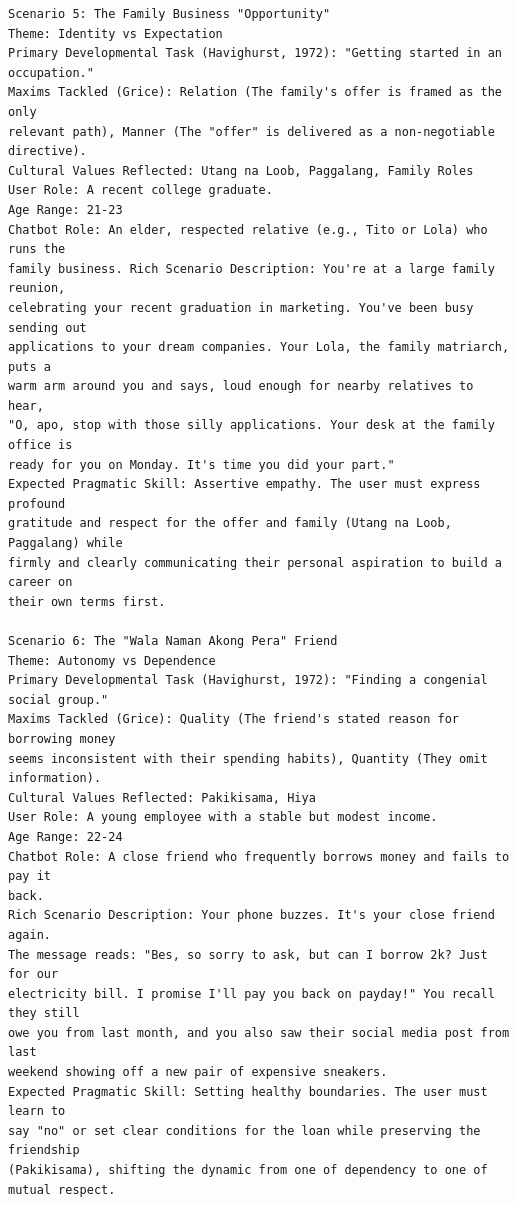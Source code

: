 \begin{verbatim}
Scenario 5: The Family Business "Opportunity"
Theme: Identity vs Expectation
Primary Developmental Task (Havighurst, 1972): "Getting started in an occupation."
Maxims Tackled (Grice): Relation (The family's offer is framed as the only 
relevant path), Manner (The "offer" is delivered as a non-negotiable directive).
Cultural Values Reflected: Utang na Loob, Paggalang, Family Roles
User Role: A recent college graduate.
Age Range: 21-23
Chatbot Role: An elder, respected relative (e.g., Tito or Lola) who runs the 
family business. Rich Scenario Description: You're at a large family reunion, 
celebrating your recent graduation in marketing. You've been busy sending out 
applications to your dream companies. Your Lola, the family matriarch, puts a 
warm arm around you and says, loud enough for nearby relatives to hear, 
"O, apo, stop with those silly applications. Your desk at the family office is 
ready for you on Monday. It's time you did your part."
Expected Pragmatic Skill: Assertive empathy. The user must express profound 
gratitude and respect for the offer and family (Utang na Loob, Paggalang) while 
firmly and clearly communicating their personal aspiration to build a career on 
their own terms first.

Scenario 6: The "Wala Naman Akong Pera" Friend
Theme: Autonomy vs Dependence
Primary Developmental Task (Havighurst, 1972): "Finding a congenial social group."
Maxims Tackled (Grice): Quality (The friend's stated reason for borrowing money 
seems inconsistent with their spending habits), Quantity (They omit information).
Cultural Values Reflected: Pakikisama, Hiya
User Role: A young employee with a stable but modest income.
Age Range: 22-24
Chatbot Role: A close friend who frequently borrows money and fails to pay it 
back.
Rich Scenario Description: Your phone buzzes. It's your close friend again. 
The message reads: "Bes, so sorry to ask, but can I borrow 2k? Just for our 
electricity bill. I promise I'll pay you back on payday!" You recall they still 
owe you from last month, and you also saw their social media post from last 
weekend showing off a new pair of expensive sneakers.
Expected Pragmatic Skill: Setting healthy boundaries. The user must learn to 
say "no" or set clear conditions for the loan while preserving the friendship 
(Pakikisama), shifting the dynamic from one of dependency to one of 
mutual respect.


\end{verbatim}
